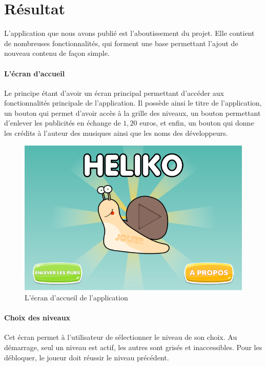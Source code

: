 \section{Résultat}

L'application que nous avons publié est l'aboutissement du projet. Elle contient de nombreuses fonctionnalités, qui forment une base permettant l'ajout de nouveau contenu de façon simple.

\paragraph{L'écran d'accueil} Le principe étant d'avoir un écran principal permettant d'accéder aux fonctionnalités principale de l'application. Il possède ainsi le titre de l'application, un bouton qui permet d'avoir accès à la grille des niveaux, un bouton permettant d'enlever les publicités en échange de $1,20$ euros, et enfin, un bouton qui donne les crédits à l'auteur des musiques ainsi que les noms des développeurs.

\begin{figure}[H]\centering
  \includegraphics[scale=0.6]{./img/resultat_accueil.png}
  \caption{L'écran d'accueil de l'application}
  \label{analytics}
\end{figure}

\paragraph{Choix des niveaux} Cet écran permet à l'utilisateur de sélectionner le niveau de son choix. Au démarrage, seul un niveau est actif, les autres sont grisés et inaccessibles. Pour les débloquer, le joueur doit réussir le niveau précédent.

